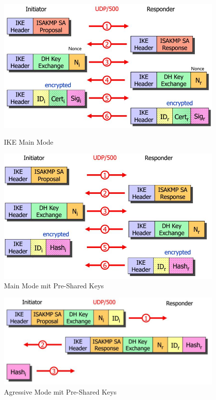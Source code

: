 \begin{figure}[ht!]
\begin{minipage}[t]{0.5\textwidth}
		\centering
		\includegraphics[width=\linewidth]{images/ike_v1_main_mode}
		\caption{IKE Main Mode}
	\end{minipage}
	\begin{minipage}[t]{0.5\textwidth}
		\centering
		\includegraphics[width=\linewidth]{images/ike_v1_main_mode_presharedkeys}
		\caption{Main Mode mit Pre-Shared Keys}
	\end{minipage}

\end{figure}
	\newline
\begin{figure}
	\begin{minipage}[t]{0.9\textwidth}
		\centering
		\includegraphics[width=0.7\linewidth]{images/ike_v1_aggressive_mode_presharedkeys}
		\newline
		\caption{Agressive Mode mit Pre-Shared Keys}
	\end{minipage}
\end{figure}


